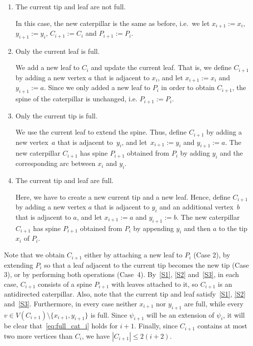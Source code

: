 \documentclass[11pt]{article}
\numberwithin{equation}{section}
\renewcommand{\leq}{\leqslant}
\theoremstyle{definition}
\begin{document}
\begin{enumerate}[label = \textbf{Case \arabic*:}, leftmargin = \widthof{Case0000}]
    \item The current tip and leaf are not full.   

       In this case, the new caterpillar is the same as before, i.e.~we let $x_{i+1} := x_{i}$, $y_{i+1} := y_i$, $C_{i+1} := C_i$ and $P_{i+1} := P_i$.  

        \vspace{0.3cm}
        
    \item Only the current leaf is full.

        We add a new leaf to $C_i$ and update the current leaf. That is, we
        define $C_{i+1}$ by adding a new vertex $a$ that is adjacent to $x_i$, and let $x_{i+1} := x_i$ and $y_{i+1} := a$.
        Since we only added a new leaf to $P_i$ in order to obtain $C_{i+1}$,
        the spine of the caterpillar is unchanged, i.e. $P_{i+1} := P_i$.
    
        \vspace{0.3cm}
    
    \item Only the current tip is full.

        We use the current leaf to extend the spine.
        Thus, define $C_{i+1}$ by adding a new vertex~$a$ that is adjacent to~$y_i$, and let~$x_{i+1} := y_i$ and $y_{i+1} := a$.        
        The new caterpillar $C_{i+1}$ has spine $P_{i+1}$ obtained from $P_i$ by adding $y_i$ and the corresponding arc between $x_i$ and $y_i$.

        \vspace{0.3cm}
    
    \item The current tip and leaf are full.

        Here, we have to create a new current tip and a new leaf. Hence,
        define $C_{i+1}$ by adding a new vertex $a$ that is adjacent to $y_i$ and an additional vertex~$b$ that is adjacent to $a$, and let $x_{i+1} := a$ and $y_{i+1} := b$. The new caterpillar $C_{i+1}$ has spine $P_{i+1}$ obtained from
        $P_i$ by appending $y_i$ and then $a$ to the tip $x_i$ of $P_i$.
\end{enumerate}

Note that we obtain $C_{i+1}$ either by attaching a new leaf to $P_i$ (Case 2), by
extending $P_i$ so that a leaf adjacent to the current tip becomes the new tip (Case 3), or by performing
both operations (Case~4). By~\ref{S1}, \ref{S2} and~\ref{S3}, in each case, $C_{i+1}$ consists of a spine $P_{i+1}$
with leaves attached to it, so $C_{i+1}$ is an antidirected caterpillar. Also, 
note that the current tip and leaf satisfy~\ref{S1}, \ref{S2} and~\ref{S3}.
Furthermore, in every case neither $x_{i+1}$ nor $y_{i+1}$ are full, while
every $v \in V(C_{i+1})\setminus \{x_{i+1},y_{i+1}\}$ is full.
Since $\psi_{i+1}$ will be an extension of $\psi_i$, it will be clear that~\eqref{eq:full_cat_i} holds for $i+1$. Finally, since $C_{i+1}$ contains at most two more vertices than $C_i$, we have $|C_{i+1}|\leq 2(i+2)$.
\end{document}
